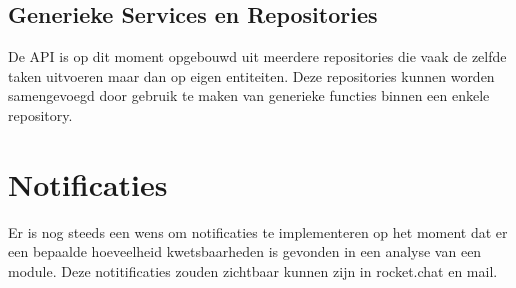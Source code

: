 \subsection{Generieke Services en Repositories}\label{subsec:generieke-services-en-repositories}
De API is op dit moment opgebouwd uit meerdere repositories die vaak de zelfde taken uitvoeren maar dan op eigen entiteiten. Deze repositories kunnen worden samengevoegd door gebruik te maken van generieke functies binnen een enkele repository.

\section{Notificaties}\label{sec:notificaties}
Er is nog steeds een wens om notificaties te implementeren op het moment dat er een bepaalde hoeveelheid kwetsbaarheden is gevonden in een analyse van een module. Deze notitificaties zouden zichtbaar kunnen zijn in rocket.chat en mail.


